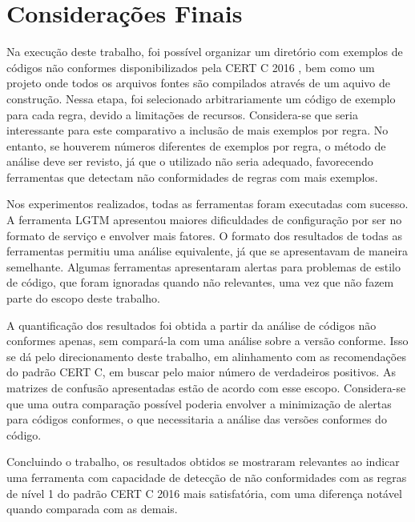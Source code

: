\chapter{Considerações Finais}
\label{cap:consideracoes}

Na execução deste trabalho, foi possível organizar um diretório com exemplos de códigos não conformes disponibilizados pela CERT C 2016 \cite{ccert}, bem como um projeto onde todos os arquivos fontes são compilados através de um aquivo de construção. Nessa etapa, foi selecionado arbitrariamente um código de exemplo para cada regra, devido a limitações de recursos. Considera-se que seria interessante para este comparativo a inclusão de mais exemplos por regra. No entanto, se houverem números diferentes de exemplos por regra, o método de análise deve ser revisto, já que o utilizado não seria adequado, favorecendo ferramentas que detectam não conformidades de regras com mais exemplos.

Nos experimentos realizados, todas as ferramentas foram executadas com su\-ces\-so. A ferramenta LGTM apresentou maiores dificuldades de configuração por ser no formato de serviço e envolver mais fatores. O formato dos resultados de todas as ferramentas permitiu uma análise equivalente, já que se apresentavam de maneira semelhante. Algumas ferramentas apresentaram alertas para problemas de estilo de código, que foram ignoradas quando não relevantes, uma vez que não fazem parte do escopo deste trabalho.

A quantificação dos resultados foi obtida a partir da análise de códigos não conformes apenas, sem compará-la com uma análise sobre a versão conforme. Isso se dá pelo direcionamento deste trabalho, em alinhamento com as recomendações do padrão CERT C, em buscar pelo maior número de verdadeiros positivos. As matrizes de confusão apresentadas estão de acordo com esse escopo. Considera-se que uma outra comparação possível poderia envolver a minimização de alertas para códigos conformes, o que necessitaria a análise das versões conformes do código.

Concluindo o trabalho, os resultados obtidos se mostraram relevantes ao indicar uma ferramenta com capacidade de detecção de não conformidades com as regras de nível 1 do padrão CERT C 2016 mais satisfatória, com uma diferença notável quando comparada com as demais.
